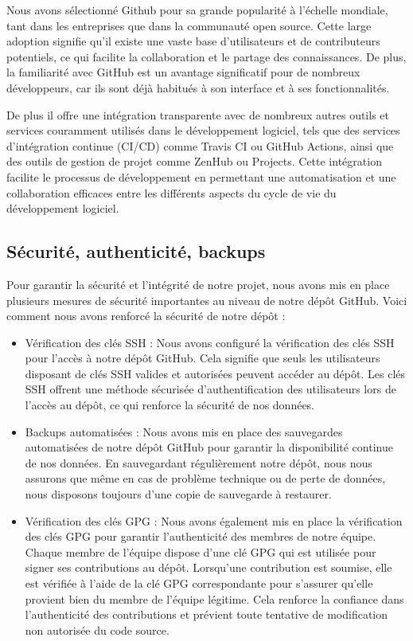 \documentclass[
	article,			%
	11pt,				%
	oneside,			%
	a4paper,			%
	chapter=TITLE,
	french,			%
	sumario=tradicional
	]{base_nt}
\begin{document}
Nous avons sélectionné Github pour sa grande popularité à l'échelle mondiale, tant dans les entreprises que dans la communauté open source. Cette large adoption signifie qu'il existe une vaste base d'utilisateurs et de contributeurs potentiels, ce qui facilite la collaboration et le partage des connaissances. De plus, la familiarité avec GitHub est un avantage significatif pour de nombreux développeurs, car ils sont déjà habitués à son interface et à ses fonctionnalités.

De plus il offre une intégration transparente avec de nombreux autres outils et services couramment utilisés dans le développement logiciel, tels que des services d'intégration continue (CI/CD) comme Travis CI ou GitHub Actions, ainsi que des outils de gestion de projet comme ZenHub ou Projects. Cette intégration facilite le processus de développement en permettant une automatisation et une collaboration efficaces entre les différents aspects du cycle de vie du développement logiciel.

\newpage

\subsection{Sécurité, authenticité, backups}

Pour garantir la sécurité et l'intégrité de notre projet, nous avons mis en place plusieurs mesures de sécurité importantes au niveau de notre dépôt GitHub. Voici comment nous avons renforcé la sécurité de notre dépôt :

\begin{itemize}
    \item Vérification des clés SSH : Nous avons configuré la vérification des clés SSH pour l'accès à notre dépôt GitHub. Cela signifie que seuls les utilisateurs disposant de clés SSH valides et autorisées peuvent accéder au dépôt. Les clés SSH offrent une méthode sécurisée d'authentification des utilisateurs lors de l'accès au dépôt, ce qui renforce la sécurité de nos données.
    \item Backups automatisées : Nous avons mis en place des sauvegardes automatisées de notre dépôt GitHub pour garantir la disponibilité continue de nos données. En sauvegardant régulièrement notre dépôt, nous nous assurons que même en cas de problème technique ou de perte de données, nous disposons toujours d'une copie de sauvegarde à restaurer.
    \item Vérification des clés GPG : Nous avons également mis en place la vérification des clés GPG pour garantir l'authenticité des membres de notre équipe. Chaque membre de l'équipe dispose d'une clé GPG qui est utilisée pour signer ses contributions au dépôt. Lorsqu'une contribution est soumise, elle est vérifiée à l'aide de la clé GPG correspondante pour s'assurer qu'elle provient bien du membre de l'équipe légitime. Cela renforce la confiance dans l'authenticité des contributions et prévient toute tentative de modification non autorisée du code source.
\end{itemize}
\end{document}
